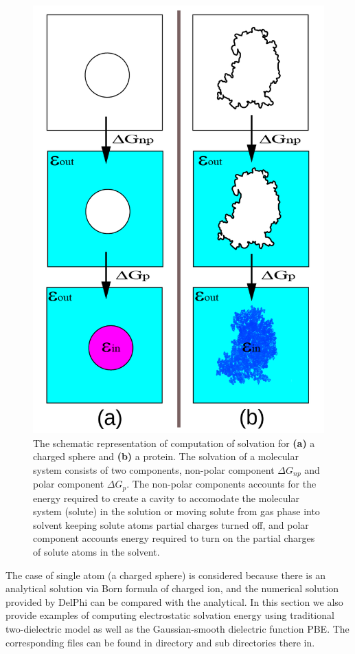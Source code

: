 \documentclass[9pt,tutorial]{livecoms}
\newcommand*\ttvar[1]{\texttt{\expandafter\dottvar\detokenize{#1}\relax}}
\newcommand*\dottvar[1]{\ifx\relax#1\else
  \expandafter\ifx\string_#1\string_\allowbreak\else#1\fi
  \expandafter\dottvar\fi}
\begin{document}
\begin{figure}[hbt!]
\includegraphics[width=\linewidth]{Figure_5.png}
\caption{The schematic representation of computation of solvation for  \textbf{(a)} a charged sphere and \textbf{(b)} a protein. The solvation of a molecular system consists of two  components, non-polar component $ \Delta G_{np} $ and polar component $ \Delta G_p $. The non-polar components accounts for the energy required to create a cavity to accomodate the molecular system (solute) in the solution or moving solute from gas phase into solvent keeping solute atoms partial charges turned off, and polar component accounts energy required to turn on the partial charges of solute atoms in the solvent.}
\label{fig:solvation}
\end{figure}

The case of single atom (a charged sphere) is considered because there is an analytical solution via Born formula of charged ion, and the numerical solution provided by DelPhi can be compared with the analytical. In this section we also provide examples of computing electrostatic solvation energy using traditional two-dielectric model as well as the Gaussian-smooth dielectric function PBE. The corresponding files can be found in directory \ttvar{Example_3.1.1/} and sub directories there in.
\end{document}
